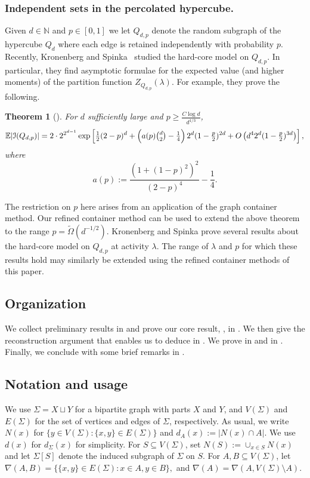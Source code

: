\documentclass[a4paper]{amsart}
\newtheorem{thm}{Theorem}[section]
\theoremstyle{definition}
\newcommand{\cI}{\mathcal{I} }
\newcommand{\sub}[0]{\subseteq}
\newcommand{\0}[0]{\emptyset}
\newcommand{\lam}{\lambda}
\begin{document}
\subsubsection*{Independent sets in the percolated hypercube.}

Given $d\in \mathbb{N}$ and $p\in [0,1]$ we let $Q_{d,p}$ denote the random subgraph of the hypercube $Q_d$ where each edge is retained independently with probability $p$. Recently, Kronenberg and Spinka~\cite{kronenberg2022independent} studied the hard-core model on $Q_{d,p}$. In particular, they find asymptotic formulae for the expected value (and higher moments) of the partition function $Z_{Q_{d,p}}(\lam)$. For example, they prove the following.

\begin{thm}[{\cite[Theorem 1.1]{kronenberg2022independent}}]\label{thm:KS}
	For $d$ sufficiently large and $p \ge \frac{C\log d}{d^{1/3}}$,
	\[ \mathbb E |\cI(Q_{d,p})| =
	2 \cdot 2^{2^{d-1}} \exp\left[ \tfrac12 (2-p)^d + \left(a(p)\tbinom d2 -\tfrac14 \right) 2^d (1-\tfrac p2)^{2d} + O\left(d^4 2^d (1- \tfrac p2)^{3d}\right) \right], \]
	where
	\[ a(p) := \frac{(1+(1-p)^2)^2 }{(2-p)^4} - \frac14 .\]
\end{thm}
The restriction on $p$ here arises from an application of the graph container method. Our refined container method can be used to extend the above theorem to the range $p=\tilde\Omega(d^{-1/2})$. Kronenberg and Spinka prove several results about the hard-core model on $Q_{d,p}$ at activity $\lam$. The range of $\lam$ and $p$ for which these results hold may similarly be extended using the refined container methods of this paper. 

\subsection{Organization}  We collect preliminary results in  and prove our core result, , in . We then give the reconstruction argument that enables us to deduce  in . We prove  in  and  in . Finally, we conclude with some brief remarks in . 

\subsection{Notation and usage} We use $\Sigma=X\sqcup Y$ for a bipartite graph with parts $X$ and $Y$, and  $V(\Sigma)$ and $ E(\Sigma)$ for the set of vertices and edges of $\Sigma$, respectively. As usual, we write $N(x)$ for $\{y \in V(\Sigma): \{x,y\} \in E(\Sigma)\}$ and $d_A(x):=|N(x) \cap A|$. We use $d(x)$ for $d_\Sigma(x)$ for simplicity. For $S \sub V(\Sigma)$, set $N(S):= \cup_{x \in S} N(x)$ and let $\Sigma[S]$ denote the induced subgraph of $\Sigma$ on $S$. For $A, B \sub V(\Sigma)$, let $\nabla(A,B)=\{\{x,y\} \in E(\Sigma):x \in A, y \in B\},$ and $\nabla(A)=\nabla(A, V(\Sigma) \setminus A)$.
\end{document}
